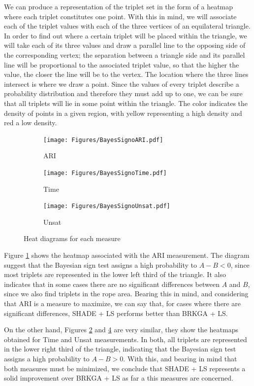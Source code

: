 \documentclass[review]{elsarticle}
\begin{document}
We can produce a representation of the triplet set in the form of a heatmap where each triplet constitutes one point. With this in mind, we will associate each of the triplet values with each of the three vertices of an equilateral triangle. In order to find out where a certain triplet will be placed within the triangle, we will take each of its three values and draw a parallel line to the opposing side of the corresponding vertex; the separation between a triangle side and its parallel line will be proportional to the associated triplet value, so that the higher the value, the closer the line will be to the vertex. The location where the three lines intersect is where we draw a point. Since the values of every triplet describe a probability distribution and therefore they must add up to one, we can be sure that all triplets will lie in some point within the triangle. The color indicates the density of points in a given region, with yellow representing a high density and red a low density.

\begin{figure}[ht!]
	\centering
	\begin{subfigure}{.45\textwidth}
		\texttt{[image: Figures/BayesSignoARI.pdf]}
		\caption{ARI}
		\label{fig:bayesARI}
	\end{subfigure}
	\begin{subfigure}{.45\textwidth}
		\texttt{[image: Figures/BayesSignoTime.pdf]}
		\caption{Time}
		\label{fig:bayesTime}
	\end{subfigure}
	\begin{subfigure}{.45\textwidth}
		\texttt{[image: Figures/BayesSignoUnsat.pdf]}
		\caption{Unsat}
		\label{fig:bayesUnsat}
	\end{subfigure}
	\caption{Heat diagrams for each measure}
\end{figure}

Figure \ref{fig:bayesARI} shows the heatmap associated with the ARI measurement. The diagram suggest that the Bayesian sign test assigns a high probability to $A - B < 0$, since most triplets are represented in the lower left third of the triangle. It also indicates that in some cases there are no significant differences between $A$ and $B$, since we also find triplets in the rope area. Bearing this in mind, and considering that ARI is a measure to maximize, we can say that, for cases where there are significant differences, SHADE + LS performs better than BRKGA + LS.

On the other hand, Figures \ref{fig:bayesTime} and \ref{fig:bayesUnsat} are very similar, they show the heatmaps obtained for Time and Unsat measurements. In both, all triplets are represented in the lower right third of the triangle, indicating that the Bayesian sign test assigns a high probability to $A - B > 0$. With this, and bearing in mind that both measures must be minimized, we conclude that SHADE + LS represents a solid improvement over BRKGA + LS as far a this measures are concerned.
\end{document}
